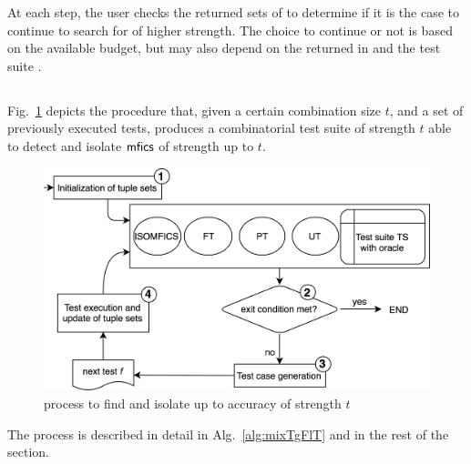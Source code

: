 \begin{tikzborder}{\cite{Gargantini16:validation}}
\begin{tikzborder}{\cite{gargantini_combinatorial_2017}}
\begin{tikzborder}{\cite{garn2019}}
\begin{tikzborder}{\cite{arcaini2019achieving}}
\begin{tikzborder}{}
At each step, the user checks the returned sets of \isoMficsSet to determine if it is the case to continue to search for \mfics of higher strength. The choice to continue or not is based on the available budget, but may also depend on the returned \mfics in \isoMficsSet and the test suite \ts.


\end{tikzborder}
\subsection{\mixt}
\begin{tikzborder}{}	

Fig.~\ref{fig:mixTgFlT} depicts the procedure \mixt that, given a certain combination size $t$, and a set of previously executed tests, produces a combinatorial test suite of strength $t$ able to detect and isolate $\textsf{mfics}$ of strength up to $t$.
%
\begin{figure}[!htb]
	\centering
	\includegraphics[width=1\columnwidth]{images/process_mix_fl_tg2}
	\caption{\mixt process to find and isolate \mfics up to accuracy of strength $t$}
	\label{fig:mixTgFlT}
\end{figure}
%
The process is described in detail in Alg.~\ref{alg:mixTgFlT} and in the rest of the section.
%
\begin{algorithm}[!htb]
	\begin{algorithmic}[1]
		\label{line:initPT}
		\label{line:initFT}

\end{algorithmic}
\end{algorithm}
\end{tikzborder}
\end{tikzborder}
\end{tikzborder}
\end{tikzborder}
\end{tikzborder}
